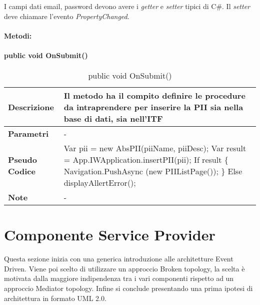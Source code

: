 I campi dati email, password devono avere i \emph{getter} e \emph{setter} tipici di C\#. Il \emph{setter} deve chiamare l’evento \emph{PropertyChanged}.
\paragraph{Metodi:}

\paragraph{public void OnSubmit()}
\begin{center}
    \begin{longtable}{|p{3cm}|p{9cm}|}%
    \caption{public void OnSubmit()}
    \endfirsthead
    \endhead
    \hline
    \textbf{Descrizione} & Il metodo ha il compito definire le procedure da intraprendere per inserire la PII sia nella base di dati, sia nell’ITF\\
    \hline
    \textbf{Parametri} &      
    -
    \\
    \hline
    \textbf{Pseudo Codice} & 
    Var pii = new AbsPII(piiName, piiDesc);\newline
    Var result = App.IWApplication.insertPII(pii);\newline
    If result \{\newline
        Navigation.PushAsync (new PIIListPage());\newline
    \}\newline
    Else displayAllertError();\newline
    \\
    \hline
    \textbf{Note} & 
    -
    \\
    \hline
    \end{longtable}
\end{center}

\newpage
\section{Componente Service Provider}
Questa sezione inizia con una generica introduzione alle architetture Event Driven. Viene poi scelto di utilizzare un approccio Broken topology, la scelta è motivata dalla maggiore indipendenza tra i vari componenti rispetto ad un approccio Mediator topology. Infine si conclude presentando una prima ipotesi di architettura in formato UML 2.0.



